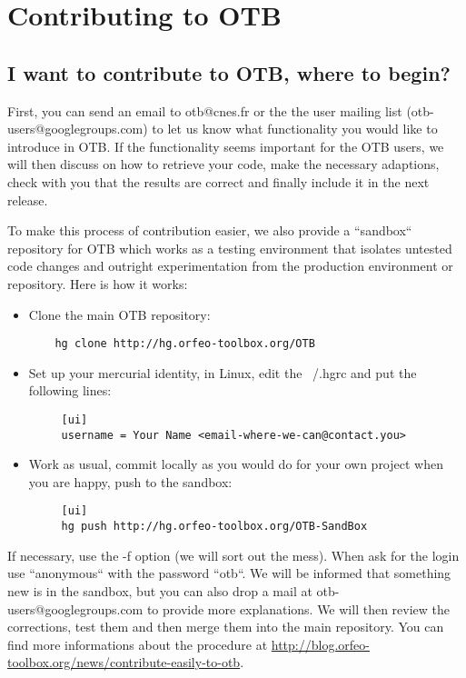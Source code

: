 \section{Contributing to OTB}\label{sec:contributing}

\subsection{I want to contribute to OTB, where to begin?}

First, you can send an email to otb@cnes.fr or the the user mailing list (otb-users@googlegroups.com) 
to let us know what functionality
you would like to introduce in OTB. If the functionality seems important for the
OTB users, we will then discuss on how to retrieve your code,
make the necessary adaptions, check with you that the results are correct and finally
include it in the next release.

To make this process of contribution easier, we also provide a 
``sandbox`` repository for OTB which works as a testing environment that
isolates untested code changes and outright experimentation from the
production environment or repository. Here is how it works:

\begin{itemize}
  \item Clone the main OTB repository: 
    \begin{verbatim}
    hg clone http://hg.orfeo-toolbox.org/OTB
    \end{verbatim}
  \item Set up your mercurial identity, in Linux, edit the ~/.hgrc and put the following lines:
    \begin{verbatim}
     [ui]
     username = Your Name <email-where-we-can@contact.you>
    \end{verbatim}
  \item Work as usual, commit locally as you would do for your own project
    when you are happy, push to the sandbox:
    \begin{verbatim}
     [ui]
     hg push http://hg.orfeo-toolbox.org/OTB-SandBox
    \end{verbatim}
\end{itemize}  

If necessary, use the -f option (we will sort out the mess). When ask
for the login use ``anonymous`` with the password ``otb``.  We will be
informed that something new is in the sandbox, but you can also drop a
mail at otb-users@googlegroups.com to provide more explanations.
We will then review the corrections, test them and then merge them
into the main repository.  You can find more informations about the
procedure at
\url{http://blog.orfeo-toolbox.org/news/contribute-easily-to-otb}.      


